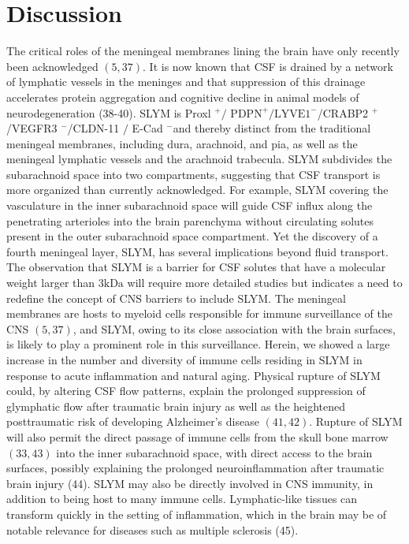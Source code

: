 \section{Discussion}
The critical roles of the meningeal membranes lining the brain have only recently been acknowledged $(5,37)$. It is now known that CSF is drained by a network of lymphatic vessels in the meninges and that suppression of this drainage accelerates protein aggregation and cognitive decline in animal models of neurodegeneration (38-40). SLYM is Proxl $^{+} /$ $\mathrm{PDPN}^{+} / \mathrm{LYVE1}^{-}$/CRABP2 ${ }^{+}$/VEGFR3 ${ }^{-}$/CLDN-11 $/$ E-Cad ${ }^{-}$and thereby distinct from the traditional meningeal membranes, including dura, arachnoid, and pia, as well as the meningeal lymphatic vessels and the arachnoid trabecula. SLYM subdivides the subarachnoid space into two compartments, suggesting that CSF transport is more organized than currently acknowledged. For example, SLYM covering the vasculature in the inner subarachnoid space will guide CSF influx along the penetrating arterioles into the brain parenchyma without circulating solutes present in the outer subarachnoid space compartment. Yet the discovery of a fourth meningeal layer, SLYM, has several implications beyond fluid transport. The observation that SLYM is a barrier for CSF solutes that have a molecular weight larger than $3 \mathrm{kDa}$ will require more detailed studies but indicates a need to redefine the concept of CNS barriers to include SLYM. The meningeal membranes are hosts to myeloid cells responsible for immune surveillance of the CNS $(5,37)$, and SLYM, owing to its close association with the brain surfaces, is likely to play a prominent role in this surveillance. Herein, we showed a large increase in the number and diversity of immune cells residing in SLYM in response to acute inflammation and natural aging. Physical rupture of SLYM could, by altering CSF flow patterns, explain the prolonged suppression of glymphatic flow after traumatic brain injury as well as the heightened posttraumatic risk of developing Alzheimer's disease $(41,42)$. Rupture of SLYM will also permit the direct passage of immune cells from the skull bone marrow $(33,43)$ into the inner subarachnoid space, with direct access to the brain surfaces, possibly explaining the prolonged neuroinflammation after traumatic brain injury (44). SLYM may also be directly involved in CNS immunity, in addition to being host to many immune cells. Lymphatic-like tissues can transform quickly in the setting of inflammation, which in the brain may be of notable relevance for diseases such as multiple sclerosis (45).

